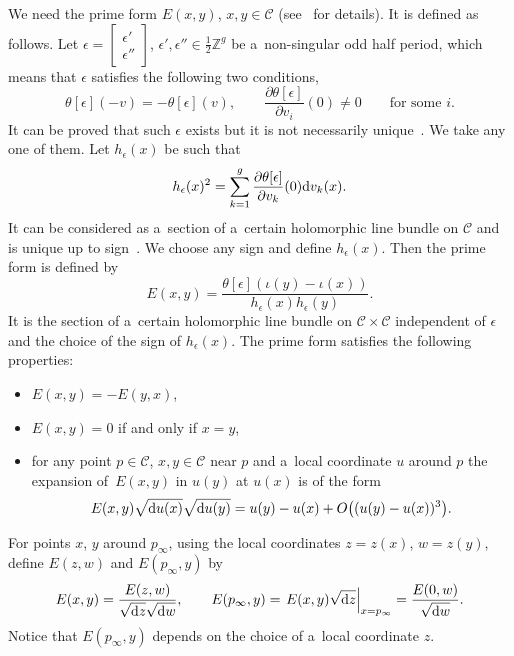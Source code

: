 \documentclass[pdftex]{sigma}
\numberwithin{equation}{section}
\theoremstyle{definition}
\begin{document}
We need the prime form $E(x,y)$, $x,y\in {\mathcal C}$ (see~\cite{Fay1973,KNTY1988,MumfordII} for details). It is defined as follows. Let $\epsilon=
\left[\begin{smallmatrix}
\epsilon'\\ \epsilon''
\end{smallmatrix}\right]$, $\epsilon',\epsilon''\in\frac{1}{2} {\mathbb Z}^g$ be a~non-singular odd half period, which means that $\epsilon$ satisfies the following
two conditions,
\[
\theta[\epsilon](-v)=-\theta[\epsilon](v),
\qquad
\frac{\partial \theta[\epsilon]}{\partial v_i}(0)\neq 0 \qquad \text{for some $i$}.
\]
It can be proved that such $\epsilon$ exists but it is not necessarily unique~\cite{Fay1973,MumfordII}.
We take any one of them.
Let $h_\epsilon(x)$ be such that
\[
 h_\epsilon(x)^2=\sum_{k=1}^g \frac{\partial \theta[\epsilon]}{\partial v_k}(0){\rm d}v_k(x).
 \]
 It can be considered as a~section of a~certain
holomorphic line bundle on ${\mathcal C}$ and is unique up to sign~\cite{Fay1973}.
We choose any sign and define
$h_\epsilon(x)$.
Then the prime form is defined by
\[
E(x,y)=\frac{\theta[\epsilon](\iota(y)-\iota(x))}{h_\epsilon(x)h_\epsilon(y)}.
\]
It is the section of a~certain holomorphic line bundle on ${\mathcal C}\times{\mathcal C}$ independent of $\epsilon$ and the choice of the sign of $h_\epsilon(x)$.
The prime form satisfies the following properties:
\begin{itemize}\itemsep=0pt
\item[(i)] $E(x,y)=-E(y,x)$,
\item[(ii)] $E(x,y)=0$ if and only if $x=y$,
\item[(iii)] for any point $p\in{\mathcal C}$, $x,y\in {\mathcal C}$ near $p$ and a~local coordinate $u$ around $p$ the expansion of~$E(x,y)$ in $u(y)$ at $u(x)$ is of the form
\begin{gather*}
E(x,y)\sqrt{{\rm d}u(x)}\sqrt{{\rm d}u(y)}=u(y)-u(x)+O\bigl((u(y)-u(x))^3\bigr).
\end{gather*}
\end{itemize}

For points $x$, $y$ around $p_\infty$,
using the local coordinates $z=z(x)$, $w=z(y)$,
 define $E(z,w)$ and $E(p_\infty,y)$ by
\begin{gather*}
E(x,y)=\frac{E(z,w)}{\sqrt{{\rm d}z}\sqrt{{\rm d}w}},
\qquad
E(p_\infty,y)=\left.E(x,y)\sqrt{{\rm d}z}\right|_{x=p_\infty}=\frac{E(0,w)}{\sqrt{{\rm d}w}}.
\end{gather*}
Notice that $E(p_\infty,y)$ depends on the choice of a~local coordinate $z$.
\end{document}
